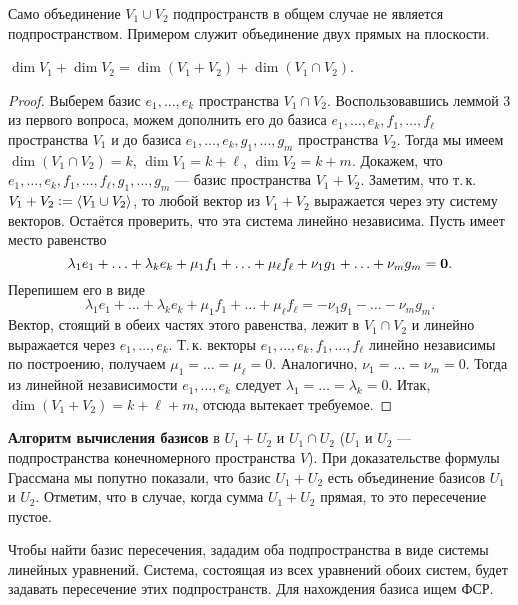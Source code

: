\begin{remark}
    Само объединение $V_1 \cup V_2$ подпространств в общем случае не является подпространством. Примером служит объединение двух прямых на плоскости.
\end{remark}

\begin{theorem}
    $\dim V_1 + \dim V_2 = \dim(V_1 + V_2) + \dim(V_1 \cap V_2)$.
\end{theorem}

\begin{proof}
    Выберем базис $e_1, \ldots, e_k$ пространства $V_1 \cap V_2$. Воспользовавшись леммой 3 из первого вопроса, можем дополнить его до базиса $e_1, \ldots, e_k, f_1, \ldots, f_\ell$ пространства $V_1$ и до базиса $e_1, \ldots, e_k, g_1, \ldots, g_m$ пространства $V_2$. Тогда мы имеем $\dim(V_1 \cap V_2) = k$, $\dim V_1 = k + \ell$, $\dim V_2 = k + m$. Докажем, что $e_1, \ldots, e_k, f_1, \ldots, f_\ell, g_1, \ldots, g_m$ --- базис пространства $V_1 + V_2$. Заметим, что т.\,к. $V_1 + V_2 \vcentcolon = \langle V_1 \cup V_2\rangle$, то любой вектор из $V_1 + V_2$ выражается через эту систему векторов. Остаётся проверить, что эта система линейно независима. Пусть имеет место равенство
    \[
        \lambda_1e_1 + \ldots + \lambda_ke_k + \mu_1f_1 + \ldots + \mu_\ell f_\ell + \nu_1g_1 + \ldots + \nu_mg_m = \boldsymbol{0}.
    \]
    Перепишем его в виде
    \[
        \lambda_1e_1 + \ldots + \lambda_ke_k + \mu_1f_1 + \ldots + \mu_\ell f_\ell = -\nu_1g_1 - \ldots - \nu_mg_m.
    \]
    Вектор, стоящий в обеих частях этого равенства, лежит в $V_1 \cap V_2$ и линейно выражается через $e_1, \ldots, e_k$. Т.\,к. векторы $e_1, \ldots, e_k, f_1, \ldots, f_\ell$ линейно независимы по построению, получаем $\mu_1 = \ldots = \mu_\ell = 0$. Аналогично, $\nu_1 = \ldots = \nu_m = 0$. Тогда из линейной независимости $e_1, \ldots, e_k$ следует $\lambda_1 = \ldots = \lambda_k = 0$. Итак, $\dim(V_1 + V_2) = k + \ell + m$, отсюда вытекает требуемое.
\end{proof}

\textbf{Алгоритм вычисления базисов} в $U_1 + U_2$ и $U_1 \cap U_2$ ($U_1$ и $U_2$ --- подпространства конечномерного пространства $V$). При доказательстве формулы Грассмана мы попутно показали, что базис $U_1 + U_2$ есть объединение базисов $U_1$ и $U_2$. Отметим, что в случае, когда сумма $U_1 + U_2$ прямая, то это пересечение пустое.

Чтобы найти базис пересечения, зададим оба подпространства в виде системы линейных уравнений. Система, состоящая из всех уравнений обоих систем, будет задавать пересечение этих подпространств. Для нахождения базиса ищем ФСР.

